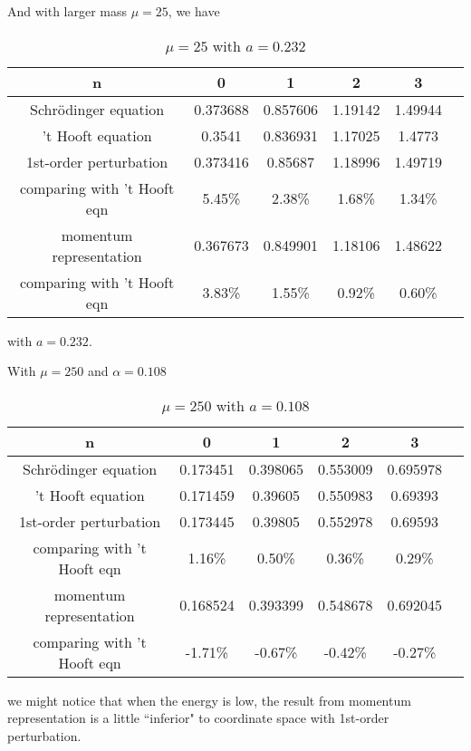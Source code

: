 \documentclass{article}
\begin{document}
And with larger mass $\mu=25$, we have
\begin{table}[H]
  \centering
  \begin{tabular}{|c|c|c|c|c|c|}
    \hline
    n & 0 & 1 & 2 & 3 \\\hline
    Schr\"odinger equation&0.373688& 0.857606& 1.19142& 1.49944\\\hline
    't Hooft equation& 0.3541& 0.836931& 1.17025&1.4773 \\\hline
    1st-order perturbation&0.373416&0.85687& 1.18996& 1.49719\\\hline
   {\color{red}{error}} comparing with 't Hooft eqn&5.45\%&2.38\%&1.68\%&1.34\%\\\hline
    momentum representation &0.367673&0.849901&1.18106&1.48622\\\hline
    {\color{red}{error}} comparing with 't Hooft eqn&3.83\%&1.55\%&0.92\%&0.60\%\\\hline
  \end{tabular}
  \caption{$\mu=25$ with $a=0.232$}
\end{table}

with $a=0.232$.

With $\mu=250$ and $\alpha=0.108$
\begin{table}[H]
  \centering
  \begin{tabular}{|c|c|c|c|c|c|}
    \hline
    n & 0 & 1 & 2 & 3 \\\hline
    Schr\"odinger equation&0.173451& 0.398065& 0.553009&0.695978\\\hline
    't Hooft equation& 0.171459& 0.39605& 0.550983&0.69393 \\\hline
    1st-order perturbation&0.173445&0.39805& 0.552978& 0.69593\\\hline
   {\color{red}{error}} comparing with 't Hooft eqn&1.16\%&0.50\%&0.36\%&0.29\%\\\hline
    momentum representation &0.168524&0.393399&0.548678&0.692045\\\hline
    {\color{red}{error}} comparing with 't Hooft eqn&-1.71\%&-0.67\%&-0.42\%&-0.27\%\\\hline
  \end{tabular}
  \caption{$\mu=250$ with $a=0.108$}
\end{table}
we might notice that when the energy is low, the result from momentum representation is a little ``inferior" to coordinate space with 1st-order perturbation.
\end{document}
